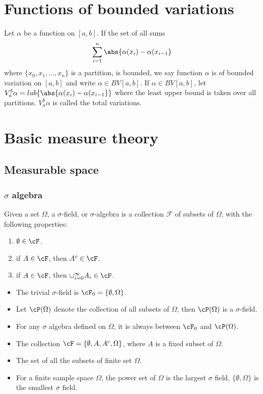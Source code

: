 \begin{refsection}
\section{Functions of bounded variations}
\begin{definition}
Let $\alpha$ be a function on $[a,b]$. If the set of all sums$$\sum_{i=1}^n \abs{\alpha(x_i)-\alpha(x_{i-1}}$$
where $\{x_0,x_1,...,x_n\}$ is a partition, is bounded, we say function $\alpha$ is of bounded variation on $[a,b]$ and write $\alpha \in BV[a,b]$.
If $\alpha \in BV[a,b]$, let $V_a^b\alpha = lub\{\abs{\alpha(x_i)-\alpha(x_{i-1}}\}$ where the least upper bound is taken over all partitions. $V_a^b\alpha$ is called the total variations. 
\end{definition}




\section{Basic measure theory}
\subsection{Measurable space}
\subsubsection{$\sigma$ algebra}
\begin{definition}
	Given a set $\Omega$, a $\sigma$-field, or $\sigma$-algebra is a collection $\mathcal{F}$ of subsets of $\Omega$, with the following properties:
	\begin{enumerate}
		\item $\emptyset \in \cF$.
		\item if $A \in \cF$, then $A^c \in \cF$.
		\item if $A \in \cF$, then $\cup_{i=0}^{\infty}A_i \in \cF$.
	\end{enumerate}
\end{definition}

\begin{example}\hfill
	\begin{itemize}
		\item The trivial $\sigma$-field is $\cF_0 = \{ \emptyset, \Omega \}$.
		\item Let $\cP(\Omega)$ denote the collection of all subsets of $\Omega$, then $\cP(\Omega)$ is a $\sigma$-field.
		\item For any $\sigma$ algebra defined on $\Omega$, it is always between $\cF_0$ and  $\cP(\Omega)$.
		\item The collection $\cF=\{\emptyset, A, A^c,\Omega \}$, where $A$ is a fixed subset of $\Omega$.
		\item The set of all the subsets of finite set $\Omega$.
		\item For a finite sample space $\Omega$, the power set of $\Omega$ is the largest $\sigma$ field, $\{\emptyset,\Omega\}$ is the smallest $\sigma$ field.
	\end{itemize}
\end{example}


\end{refsection}
